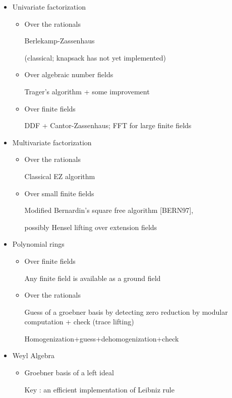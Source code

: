\begin{slide}{}
\begin{itemize}
\item Univariate factorization

\begin{itemize}
\item Over the rationals

Berlekamp-Zassenhaus

(classical; knapsack has not yet implemented)

\item Over algebraic number fields

Trager's algorithm + some improvement

\item Over finite fields

DDF + Cantor-Zassenhaus; FFT for large finite fields
\end{itemize}

\item Multivariate factorization

\begin{itemize}
\item Over the rationals

Classical EZ algorithm

\item Over small finite fields

Modified Bernardin's square free algorithm [BERN97],

possibly Hensel lifting over extension fields
\end{itemize}

\end{itemize}
\end{slide}

\begin{slide}{}
\begin{itemize}
\item Polynomial rings
\begin{itemize}
\item Over finite fields

Any finite field is available as a ground field

\item Over the rationals

Guess of a groebner basis by detecting zero reduction by modular computation
+ check (trace lifting)

Homogenization+guess+dehomogenization+check
\end{itemize}

\item Weyl Algebra

\begin{itemize}
\item Groebner basis of a left ideal

Key : an efficient implementation of Leibniz rule
\end{itemize}

\end{itemize}
\end{slide}

